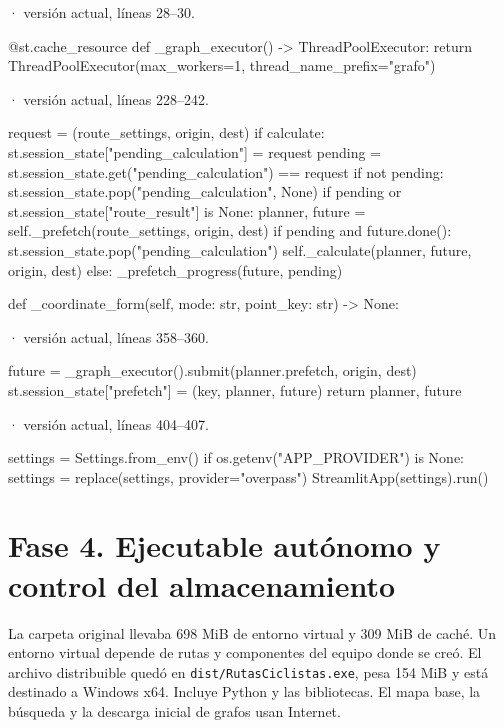 \documentclass[11pt,a4paper]{article}
\begin{document}
\smallskip
{\footnotesize\texttt{} · versión actual, líneas 28--30.}\par
\begin{Codigo}[firstnumber=28]
@st.cache_resource
def _graph_executor() -> ThreadPoolExecutor:
    return ThreadPoolExecutor(max_workers=1, thread_name_prefix="grafo")
\end{Codigo}

\smallskip
{\footnotesize\texttt{} · versión actual, líneas 228--242.}\par
\begin{Codigo}[firstnumber=228]
        request = (route_settings, origin, dest)
        if calculate:
            st.session_state["pending_calculation"] = request
        pending = st.session_state.get("pending_calculation") == request
        if not pending:
            st.session_state.pop("pending_calculation", None)
        if pending or st.session_state["route_result"] is None:
            planner, future = self._prefetch(route_settings, origin, dest)
            if pending and future.done():
                st.session_state.pop("pending_calculation")
                self._calculate(planner, future, origin, dest)
            else:
                _prefetch_progress(future, pending)

    def _coordinate_form(self, mode: str, point_key: str) -> None:
\end{Codigo}

\smallskip
{\footnotesize\texttt{} · versión actual, líneas 358--360.}\par
\begin{Codigo}[firstnumber=358]
        future = _graph_executor().submit(planner.prefetch, origin, dest)
        st.session_state["prefetch"] = (key, planner, future)
        return planner, future
\end{Codigo}

\smallskip
{\footnotesize\texttt{} · versión actual, líneas 404--407.}\par
\begin{Codigo}[firstnumber=404]
    settings = Settings.from_env()
    if os.getenv("APP_PROVIDER") is None:
        settings = replace(settings, provider="overpass")
    StreamlitApp(settings).run()
\end{Codigo}

\section{Fase 4. Ejecutable autónomo y control del almacenamiento}
La carpeta original llevaba 698 MiB de entorno virtual y 309 MiB de caché. Un entorno virtual depende de rutas y componentes del equipo donde se creó. El archivo distribuible quedó en \texttt{dist/RutasCiclistas.exe}, pesa 154 MiB y está destinado a Windows x64. Incluye Python y las bibliotecas. El mapa base, la búsqueda y la descarga inicial de grafos usan Internet.
\end{document}
